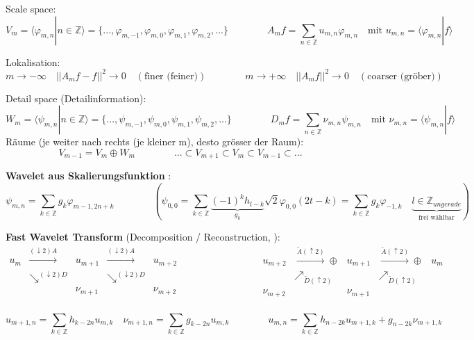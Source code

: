Scale space: 
\[
	V_m = \langle \varphi_{m,n}|n \in \mathbb{Z}  \rangle = \{ ...,\varphi_{m,-1},\varphi_{m,0}, \varphi_{m,1}, \varphi_{m,2},... \}
	\qquad \qquad
	A_mf = \sum_{n \in \mathbb{Z}} u_{m,n}\varphi_{m,n} \quad \text{mit } u_{m,n}=\langle \varphi_{m,n}|f \rangle
\]

Lokalisation:
\[  
	m \rightarrow -\infty \quad ||A_mf - f||^2 \rightarrow 0 \quad (\text{finer (feiner)})
	\qquad \qquad
	m \rightarrow +\infty \quad ||A_mf||^2 \rightarrow 0 \quad (\text{coarser (gröber)})
\]

Detail space (Detailinformation):
\[
	W_m = \langle \psi_{m,n} | n \in \mathbb{Z} \rangle = \{ ...,\psi_{m,-1},\psi_{m,0}, \psi_{m,1}, \psi_{m,2},... \}
	\qquad \qquad
	D_mf = \sum_{n \in \mathbb{Z}} \nu_{m,n}\psi_{m,n} \quad \text{mit } \nu_{m,n}=\langle \psi_{m,n}|f \rangle
\]
Räume (je weiter nach rechts (je kleiner m), desto grösser der Raum):
\[ V_{m-1} = V_m \oplus W_m  \qquad \qquad ...\subset V_{m+1} \subset V_{m} \subset V_{m-1} \subset ... \]

\textbf{Wavelet aus Skalierungsfunktion} :
\[
	\psi_{m,n} = \sum_{k \in \mathbb{Z}} g_k \varphi_{m-1,2n+k} 
	\qquad \qquad 
	\left(\psi_{0,0}=\sum_{k \in \mathbb{Z}} \underbrace{(-1)^k h_{l-k}}_{g_k} \sqrt{2}  \varphi_{0,0}(2t-k) = \sum_{k \in \mathbb{Z}} g_k \varphi_{-1,k} \quad \underbrace{l \in \mathbb{Z}_{ungerade}}_{\text{frei wählbar}} \right)
\]

\textbf{Fast Wavelet Transform} (Decomposition / Reconstruction, ):
\[
	\boxed{\begin{array}{ccccc}
		u_m & \xrightarrow{(\downarrow 2)A} & u_{m+1} & \xrightarrow{(\downarrow 2)A} & u_{m+2} \\
		& \searrow^{(\downarrow 2)D} & & \searrow^{(\downarrow 2)D} & \\
		& & \nu_{m+1} & & \nu_{m+2} \\
	\end{array}}
	\qquad \qquad \qquad \qquad
	\boxed{\begin{array}{ccccc}
		u_{m+2} & \xrightarrow{\tilde{A}(\uparrow 2)} \oplus& u_{m+1} & \xrightarrow{\tilde{A}(\uparrow 2)} \oplus & u_{m} \\
		& \nearrow_{\tilde{D} (\uparrow 2)} & & \nearrow_{\tilde{D} (\uparrow 2)} & \\
		\nu_{m+2}& & \nu_{m+1} & & \\
	\end{array}}
\]

\[  
	u_{m+1,n} = \sum_{k \in  \mathbb{Z}} h_{k-2n} u_{m,k} \quad \nu_{m+1,n} = \sum_{k \in  \mathbb{Z}} g_{k-2n} u_{m,k}
	\qquad \qquad
	u_{m,n} = \sum_{k \in  \mathbb{Z}} h_{n-2k} u_{m+1,k} + g_{n-2k} \nu_{m+1,k}
\]

